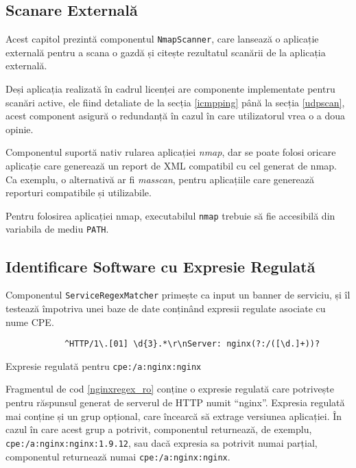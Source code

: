 \subsection*{Scanare Externală}

	Acest capitol prezintă componentul \texttt{NmapScanner}, care lansează o aplicație externală pentru a scana o gazdă și citește rezultatul scanării de la aplicația externală.
	
	Deși aplicația realizată în cadrul licenței are componente implementate pentru scanări active, ele fiind detaliate de la secția \ref{icmpping} până la secția \ref{udpscan}, acest component asigură o redundanță în cazul în care utilizatorul vrea o a doua opinie.
	
	Componentul suportă nativ rularea aplicației \textit{nmap}, dar se poate folosi oricare aplicație care generează un report de XML compatibil cu cel generat de nmap. Ca exemplu, o alternativă ar fi \textit{masscan}, pentru aplicațiile care generează reporturi compatibile și utilizabile.
	
	Pentru folosirea aplicației nmap, executabilul \texttt{nmap} trebuie să fie accesibilă din variabila de mediu \texttt{PATH}.

\subsection*{Identificare Software cu Expresie Regulată}

	Componentul \texttt{ServiceRegexMatcher} primește ca input un banner de serviciu, și îl testează împotriva unei baze de date conținând expresii regulate asociate cu nume CPE.
	
	\begin{listing}[H]
		\begin{verbatim}
			^HTTP/1\.[01] \d{3}.*\r\nServer: nginx(?:/([\d.]+))?
		\end{verbatim}
		\caption{Expresie regulată pentru \texttt{cpe:/a:nginx:nginx}}
		\label{nginxregex_ro}
	\end{listing}
	
	Fragmentul de cod \ref{nginxregex_ro} conține o expresie regulată care potrivește pentru răspunsul generat de serverul de HTTP numit ``nginx''. Expresia regulată mai conține și un grup opțional, care încearcă să extrage versiunea aplicației. În cazul în care acest grup a potrivit, componentul returnează, de exemplu, \texttt{cpe:/a:nginx:nginx:1.9.12}, sau dacă expresia sa potrivit numai parțial, componentul returnează numai \texttt{cpe:/a:nginx:nginx}.
	
